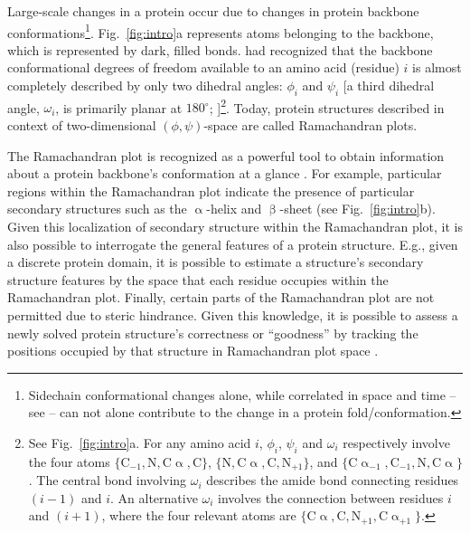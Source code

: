 \documentclass[fleqn,10pt]{wlpeerj} %
\newcommand{\Fig}[1]{Fig.~\ref{#1}}
\begin{document}
Large-scale changes in a protein occur due to changes in protein backbone conformations\footnote{Sidechain conformational changes alone, while correlated in space and time -- see \cite{DuBay2011} -- can not alone contribute to the change in a protein fold/conformation.}. 
\Fig{fig:intro}a represents atoms belonging to the backbone, which is represented by dark, filled bonds. \cite{Ramachandran1963} had recognized that the backbone conformational degrees of freedom available to an amino acid (residue) $i$ is almost completely described by only two dihedral angles: $\phi_i$ and $\psi_i$ [a third dihedral angle, $\omega_i$, is primarily planar at $180^\circ$; \cite{Pauling1951a,Pauling1951}]\footnote{See \Fig{fig:intro}a. For any amino acid $i$, $\phi_i$, $\psi_i$ and $\omega_i$ respectively involve the four atoms 
$\{\mathrm{C}_\mathrm{-1}, \mathrm{N}, \mathrm{C}\upalpha, \mathrm{C}\}$,
$\{\mathrm{N}, \mathrm{C}\upalpha, \mathrm{C}, \mathrm{N}_\mathrm{+1}\}$, and  
$\{\mathrm{C}\upalpha_\mathrm{-1}, \mathrm{C_{-1}}, \mathrm{N},\mathrm{C}\upalpha\}$.
The central bond involving $\omega_i$ describes the amide bond connecting residues $(i-1)$ and $i$. An alternative $\omega_i$ involves the connection between residues $i$ and $(i+1)$, where the four relevant atoms are $\{\mathrm{C}\upalpha, \mathrm{C}, \mathrm{N_{+1}},\mathrm{C}\upalpha_{+1}\}$.}. 
Today, protein structures described in context of two-dimensional $(\phi,\psi)$-space are called Ramachandran plots.

The Ramachandran plot is recognized as a powerful tool to obtain information about a protein backbone's conformation at a glance \citep{Berg2006,Alberts2002,Subramanian2001}. For example, particular regions within the Ramachandran plot indicate the presence of particular secondary structures such as the $\upalpha$-helix and $\upbeta$-sheet (see \Fig{fig:intro}b). Given this localization of secondary structure within the Ramachandran plot, it is also possible to interrogate the general features of a protein structure. E.g., given a discrete protein domain, it is possible to estimate a structure's secondary structure features %
by the space that each residue occupies within the Ramachandran plot. Finally, certain parts of the Ramachandran plot are not permitted due to steric hindrance. Given this knowledge, it is possible to assess a newly solved protein structure's correctness or ``goodness'' by tracking the positions occupied by that structure in Ramachandran plot space \citep{Laskowski1993,Hooft1997,Laskowski2003}. 
\end{document}
